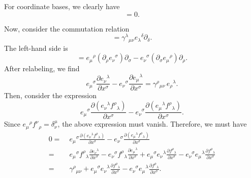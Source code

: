 \begin{solution}
    For coordinate bases, we clearly have
    \begin{equation}
        [\partial_\mu, \partial_\nu] = 0.
    \end{equation}

    Now, consider the commutation relation
    \begin{equation}
        [e_\mu{}^\rho\partial_\rho,e_\nu{}^\sigma\partial_\sigma] = \gamma^\lambda{}_{\mu\nu}e_\lambda{}^\delta\partial_\delta.
    \end{equation}
    The left-hand side is
    \begin{equation}
        [e_\mu{}^\rho\partial_\rho,e_\nu{}^\sigma\partial_\sigma] = e_\mu{}^\rho(\partial_\rho e_\nu{}^\sigma)\partial_\sigma - e_\nu{}^\sigma(\partial_\sigma e_\mu{}^\rho)\partial_\rho.
    \end{equation}
    After relabeling, we find
    \begin{equation}
        e_\mu{}^\sigma\frac{\partial e_\nu{}^\lambda}{\partial x^\sigma} - e_\nu{}^\sigma\frac{\partial e_\mu{}^\lambda}{\partial x^\sigma} = \gamma^\rho{}_{\mu\nu}\,e_\rho{}^\lambda.
    \end{equation}
    Then, consider the expression
    \begin{equation}
        e_\mu{}^\sigma\frac{\partial (e_\nu{}^\lambda f^\rho{}_\lambda)}{\partial x^\sigma} - e_\nu{}^\sigma\frac{\partial (e_\mu{}^\lambda f^\rho{}_\lambda)}{\partial x^\sigma}.
    \end{equation}
    Since $e_\mu{}^\rho f^\nu{}_\rho = \delta^\mu_\nu$, the above expression must vanish. Therefore, we must have
    \begin{equation}
    \begin{aligned}
        0=\;&e_\mu{}^\sigma\frac{\partial (e_\nu{}^\lambda f^\rho{}_\lambda)}{\partial x^\sigma} - e_\nu{}^\sigma\frac{\partial (e_\mu{}^\lambda f^\rho{}_\lambda)}{\partial x^\sigma} \\
        =\;& e_\mu{}^\sigma f^\rho{}_\lambda \frac{\partial e_\nu{}^\lambda}{\partial x^\sigma} - e_\nu{}^\sigma f^\rho{}_\lambda\frac{\partial e_\mu{}^\lambda }{\partial x^\sigma} + e_\mu{}^\sigma e_\nu{}^\lambda\frac{\partial  f^\rho{}_\lambda}{\partial x^\sigma} - e_\nu{}^\sigma e_\mu{}^\lambda\frac{\partial  f^\rho{}_\lambda}{\partial x^\sigma}\\
        =\; & \gamma^\rho{}_{\mu\nu} + e_\mu{}^\sigma e_\nu{}^\lambda\frac{\partial  f^\rho{}_\lambda}{\partial x^\sigma} - e_\nu{}^\sigma e_\mu{}^\lambda\frac{\partial  f^\rho{}_\lambda}{\partial x^\sigma}.

\end{aligned}
\end{equation}
\end{solution}
